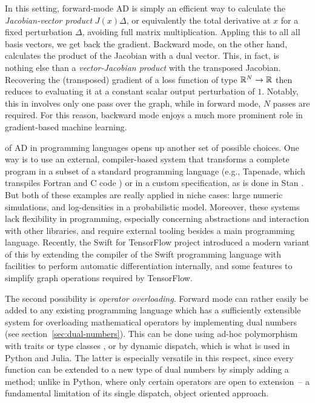 In this setting, forward-mode AD is simply an efficient way to calculate the \emph{Jacobian-vector
  product} \(J(x) \Delta\), or equivalently the total derivative at \(x\) for a fixed perturbation
\(\Delta\), avoiding full matrix multiplication.  Appling this to all all basis vectors, we get back
the gradient.  Backward mode, on the other hand, calculates the product of the Jacobian with a dual
vector.  This, in fact, is nothing else than a \emph{vector-Jacobian product} with the transposed
Jacobian.  Recovering the (transposed) gradient of a loss function of type \(\mathbb{R}^N \to \mathbb{R}\) then
reduces to evaluating it at a constant scalar output perturbation of \(1\).  Notably, this in
involves only one pass over the graph, while in forward mode, \(N\) passes are required.  For this
reason, backward mode enjoys a much more prominent role in gradient-based machine learning.

 of AD in programming languages opens up another set of
possible choices.  One way is to use an external, compiler-based system that transforms a complete
program in a subset of a standard programming language (e.g., Tapenade, which transpiles Fortran and
C code \parencite{tapenadedevelopers2019tapenade}) or in a custom specification, as is done in Stan
\parencite{carpenter2015stan}.  But both of these examples are really applied in niche cases: large
numeric simulations, and log-densities in a probabilistic model.  Moreover, these systems lack
flexibility in programming, especially concerning abstractions and interaction with other libraries,
and require external tooling besides a main programming language.  Recently, the Swift for
TensorFlow project \parencite{tensorflowdevelopers2018swift,hong2018graph} introduced a modern
variant of this by extending the compiler of the Swift programming language with facilities to
perform automatic differentiation internally, and some features to simplify graph operations
required by TensorFlow.

The second possibility is \emph{operator overloading}.  Forward mode can rather easily be added to
any existing programming language which has a sufficiently extensible system for overloading
mathematical operators by implementing dual numbers (see section~\ref{sec:dual-numbers}).  This can
be done using ad-hoc polymorphism with traits \parencite{amin2016dependent} or type classes
\parencite{wadler1989how}, or by dynamic dispatch, which is what is used in Python and Julia.  The
latter is especially versatile in this respect, since every function can be extended to a new type
of dual numbers by simply adding a method; unlike in Python, where only certain operators are open
to extension~-- a fundamental limitation of its single dispatch, object oriented approach.

